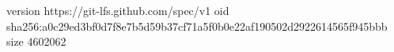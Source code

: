 version https://git-lfs.github.com/spec/v1
oid sha256:a0c29ed3bf0d7f8e7b5d59b37cf71a5f0b0e22af190502d2922614565f945bbb
size 4602062
